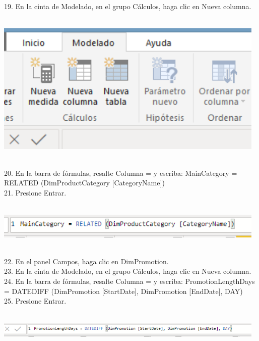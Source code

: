 \begin{flushleft}
\begin{itemize}
19. En la cinta de Modelado, en el grupo Cálculos, haga clic en Nueva columna.\\
\textbf{ }\\
\begin{center}
	\includegraphics[width=13cm]{./Imagenes/img37} 
	\end{center}
\textbf{ }\\

20. En la barra de fórmulas, resalte Columna = y escriba:
MainCategory = RELATED (DimProductCategory [CategoryName])\\
21. Presione Entrar.\\
\textbf{ }\\
\begin{center}
	\includegraphics[width=13cm]{./Imagenes/img39} 
	\end{center}
\textbf{ }\\

22. En el panel Campos, haga clic en DimPromotion.\\
23. En la cinta de Modelado, en el grupo Cálculos, haga clic en Nueva columna.\\
24. En la barra de fórmulas, resalte Columna = y escriba:
PromotionLengthDays = DATEDIFF (DimPromotion [StartDate], DimPromotion [EndDate], DAY)\\
25. Presione Entrar.\\
\textbf{ }\\
\begin{center}
	\includegraphics[width=13cm]{./Imagenes/img40} 
	\end{center}
\textbf{ }\\
\textbf{ }\\
\textbf{ }\\
\textbf{ }\\
\textbf{ }\\


\end{itemize}
\end{flushleft}
